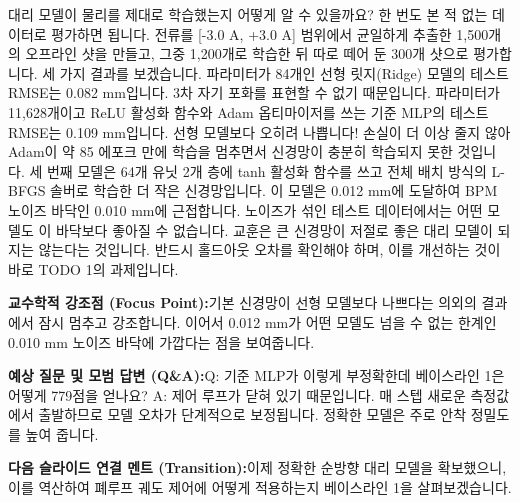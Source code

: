 \documentclass[11pt,a4paper]{article}
\begin{document}
\begin{tcolorbox}[colback=white,colframe=primaryblue,title={\footnotesize\bfseries\color{white}발표자 구두 대본 (Spoken Script)},fontupper=\small,left=6pt,right=6pt,top=3pt,bottom=3pt,boxrule=0.8pt,arc=2.5pt]
대리 모델이 물리를 제대로 학습했는지 어떻게 알 수 있을까요? 한 번도 본 적 없는 데이터로 평가하면 됩니다. 전류를 [-3.0 A, +3.0 A] 범위에서 균일하게 추출한 1,500개의 오프라인 샷을 만들고, 그중 1,200개로 학습한 뒤 따로 떼어 둔 300개 샷으로 평가합니다. 세 가지 결과를 보겠습니다. 파라미터가 84개인 선형 릿지(Ridge) 모델의 테스트 RMSE는 0.082 mm입니다. 3차 자기 포화를 표현할 수 없기 때문입니다. 파라미터가 11,628개이고 ReLU 활성화 함수와 Adam 옵티마이저를 쓰는 기준 MLP의 테스트 RMSE는 0.109 mm입니다. 선형 모델보다 오히려 나쁩니다! 손실이 더 이상 줄지 않아 Adam이 약 85 에포크 만에 학습을 멈추면서 신경망이 충분히 학습되지 못한 것입니다. 세 번째 모델은 64개 유닛 2개 층에 tanh 활성화 함수를 쓰고 전체 배치 방식의 L-BFGS 솔버로 학습한 더 작은 신경망입니다. 이 모델은 0.012 mm에 도달하여 BPM 노이즈 바닥인 0.010 mm에 근접합니다. 노이즈가 섞인 테스트 데이터에서는 어떤 모델도 이 바닥보다 좋아질 수 없습니다. 교훈은 큰 신경망이 저절로 좋은 대리 모델이 되지는 않는다는 것입니다. 반드시 홀드아웃 오차를 확인해야 하며, 이를 개선하는 것이 바로 TODO 1의 과제입니다.
\end{tcolorbox}
\vspace{0.2em}
\begin{tcolorbox}[colback=lightbg,colframe=bordergray,left=6pt,right=6pt,top=3pt,bottom=3pt,boxrule=0.6pt,arc=2.5pt]
\small
\noindent\textbf{\color{navy}교수학적 강조점 (Focus Point):}\enspace 기본 신경망이 선형 모델보다 나쁘다는 의외의 결과에서 잠시 멈추고 강조합니다. 이어서 0.012 mm가 어떤 모델도 넘을 수 없는 한계인 0.010 mm 노이즈 바닥에 가깝다는 점을 보여줍니다.\par\vspace{0.3em}
\noindent\textbf{\color{successgreen}예상 질문 및 모범 답변 (Q\&A):}\enspace Q: 기준 MLP가 이렇게 부정확한데 베이스라인 1은 어떻게 779점을 얻나요? A: 제어 루프가 닫혀 있기 때문입니다. 매 스텝 새로운 측정값에서 출발하므로 모델 오차가 단계적으로 보정됩니다. 정확한 모델은 주로 안착 정밀도를 높여 줍니다.\par\vspace{0.3em}
\noindent\textbf{\color{accent}다음 슬라이드 연결 멘트 (Transition):}\enspace 이제 정확한 순방향 대리 모델을 확보했으니, 이를 역산하여 폐루프 궤도 제어에 어떻게 적용하는지 베이스라인 1을 살펴보겠습니다.
\end{tcolorbox}
\clearpage
\hypertarget{slide.23}{}
\end{document}
